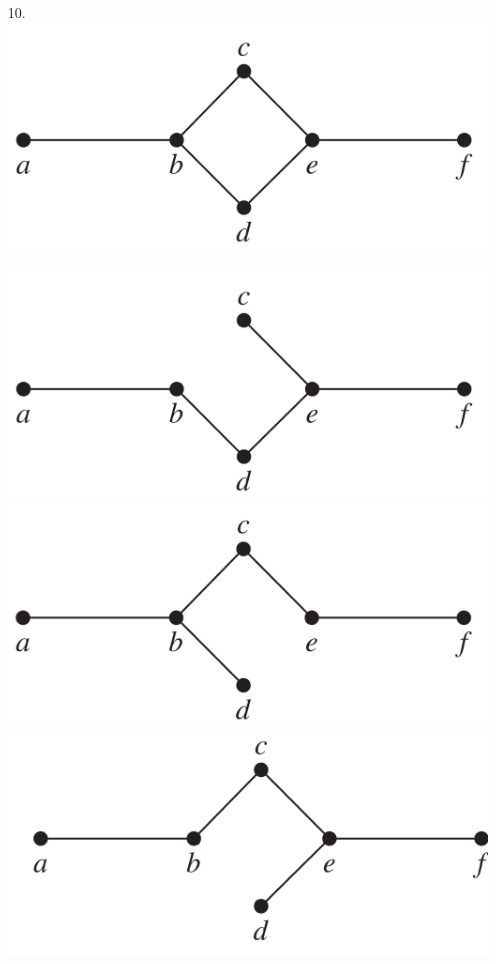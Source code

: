 \begin{itemize}
\item[10.] \text{}\\
\includegraphics[scale = 0.3]{img/11_4_10_graph.png} \vspace{2mm} \\
\answer \\
\includegraphics[scale = 0.3]{img/11_4_10_tree1.png} 
\includegraphics[scale = 0.3]{img/11_4_10_tree2.png} \\
\includegraphics[scale = 0.3]{img/11_4_10_tree3.png} 

\end{itemize}
